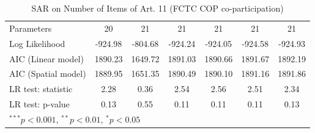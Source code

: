 \begin{table}[!h]
\begin{center}
\begin{tabular}{l c c c c c c }
Parameters              & 20           & 21           & 21           & 21           & 21           & 21           \\
Log Likelihood          & -924.98      & -804.68      & -924.24      & -924.05      & -924.58      & -924.93      \\
AIC (Linear model)      & 1890.23      & 1649.72      & 1891.03      & 1890.66      & 1891.67      & 1892.19      \\
AIC (Spatial model)     & 1889.95      & 1651.35      & 1890.49      & 1890.10      & 1891.16      & 1891.86      \\
LR test: statistic      & 2.28         & 0.36         & 2.54         & 2.56         & 2.51         & 2.34         \\
LR test: p-value        & 0.13         & 0.55         & 0.11         & 0.11         & 0.11         & 0.13         \\
\bottomrule
\multicolumn{7}{l}{\scriptsize{$^{***}p<0.001$, $^{**}p<0.01$, $^*p<0.05$}}
\end{tabular}
\caption{SAR on Number of Items of Art. 11 (FCTC COP co-participation)}
\label{table:coefficients}
\end{center}
\end{table}
